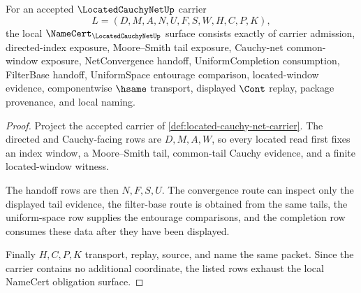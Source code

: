 \begin{theorem}
\label{thm:located-cauchy-net-namecert-obligations}
For an accepted $\LocatedCauchyNetUp$ carrier
$$
L=(D,M,A,N,U,F,S,W,H,C,P,K),
$$
the local $\NameCert_{\LocatedCauchyNetUp}$ surface consists exactly of carrier admission, directed-index exposure, Moore--Smith tail exposure, Cauchy-net common-window exposure, NetConvergence handoff, UniformCompletion consumption, FilterBase handoff, UniformSpace entourage comparison, located-window evidence, componentwise $\hsame$ transport, displayed $\Cont$ replay, package provenance, and local naming.
\end{theorem}
\begin{proof}
Project the accepted carrier of \autoref{def:located-cauchy-net-carrier}. The directed and Cauchy-facing rows are $D,M,A,W$, so every located read first fixes an index window, a Moore--Smith tail, common-tail Cauchy evidence, and a finite located-window witness.

The handoff rows are then $N,F,S,U$. The convergence route can inspect only the displayed tail evidence, the filter-base route is obtained from the same tails, the uniform-space row supplies the entourage comparisons, and the completion row consumes these data after they have been displayed.

Finally $H,C,P,K$ transport, replay, source, and name the same packet. Since the carrier contains no additional coordinate, the listed rows exhaust the local NameCert obligation surface.
\end{proof}

